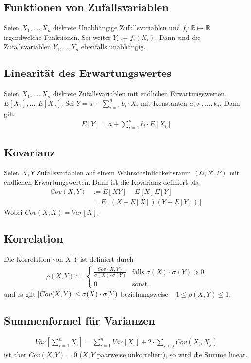 \documentclass[8pt]{extarticle}
\newcommand{\R}{\mathbb{R}}
\newcommand{\F}{\mathcal{F}}
\newcommand{\Sn}{\sum_{i = 1}^n}
\newcommand{\zufallsvariablen}{X_1, \dots, X_n}
\begin{document}
\begin{multicols*}{3}
  \subsection*{Funktionen von Zufallsvariablen}
  Seien $\zufallsvariablen$ diskrete Unabhängige Zufallsvariablen und
  $f_i: \R \mapsto \R$ irgendwelche Funktionen. Sei
  weiter $Y_i := f_i(X_i)$. Dann sind die Zufallsvariablen $Y_1, \dots, Y_n$
  ebenfalls unabhängig.
  \subsection*{Linearität des Erwartungswertes}
  Seien $\zufallsvariablen$ diskrete Zufallsvariablen mit
  endlichen Erwartungswerten. $E[X_1], \dots, E[X_n]$. Sei
  $Y = a + \Sn b_i \cdot X_i$ mit Konstanten $a, b_1, \dots, b_n$. Dann gilt:
  \begin{align*}
    E[Y] = a + \Sn b_i \cdot E[X_i]
  \end{align*}
  \subsection*{Kovarianz}
  Seien $X, Y$ Zufallsvariablen auf einem Wahrscheinlichkeitsraum $(\Omega, \F, P)$
  mit endlichen Erwartungswerten. Dann ist die Kovarianz definiert als:
  \begin{align*}
    Cov(X, Y) & := E[XY] - E[X]E[Y]        \\
              & = E[(X - E[X]) (Y - E[Y])]
  \end{align*}
  Wobei $Cov(X, X) = Var[X]$.
  \subsection*{Korrelation}
  Die Korrelation von $X, Y$ ist definiert durch
  \begin{align*}
    \rho(X, Y) := \begin{cases}
      \frac{Cov(X, Y)}{\sigma(X) \cdot \sigma(Y)} & \text{falls } \sigma(X) \cdot \sigma(Y) > 0 \\
      0                                           & \text{sonst.}
    \end{cases}
  \end{align*}
  und es gilt $\abs{Cov(X, Y)} \leq \sigma(X) \cdot \sigma(Y)$
  beziehungsweise $-1 \leq \rho(X, Y) \leq 1$.
  \subsection*{Summenformel für Varianzen}
  \begin{align*}
    Var \left[ \Sn X_i \right] = \Sn Var[X_i] + 2 \cdot \sum_{i < j} Cov(X_i, X_j)
  \end{align*}
  ist aber $Cov(X, Y) = 0$ ($X, Y$ paarweise unkorreliert), so wird
  die Summe linear.

\end{multicols*}
\end{document}
